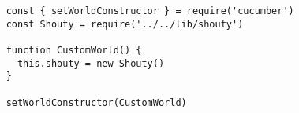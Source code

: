 \begin{verbatim}
    const { setWorldConstructor } = require('cucumber')
    const Shouty = require('../../lib/shouty')

    function CustomWorld() {
      this.shouty = new Shouty()
    }

    setWorldConstructor(CustomWorld)
\end{verbatim}
